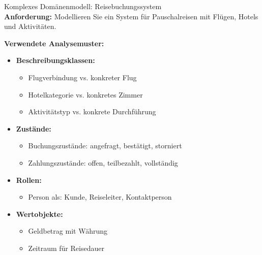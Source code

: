 \begin{example2}{Komplexes Domänenmodell: Reisebuchungssystem}\\
\textbf{Anforderung:} Modellieren Sie ein System für Pauschalreisen mit Flügen, Hotels und Aktivitäten.

\textbf{Verwendete Analysemuster:}
\begin{itemize}
    \item \textbf{Beschreibungsklassen:}
    \begin{itemize}
        \item Flugverbindung vs. konkreter Flug
        \item Hotelkategorie vs. konkretes Zimmer
        \item Aktivitätstyp vs. konkrete Durchführung
    \end{itemize}
    
    \item \textbf{Zustände:}
    \begin{itemize}
        \item Buchungszustände: angefragt, bestätigt, storniert
        \item Zahlungszustände: offen, teilbezahlt, vollständig
    \end{itemize}
    
    \item \textbf{Rollen:}
    \begin{itemize}
        \item Person als: Kunde, Reiseleiter, Kontaktperson
    \end{itemize}
    
    \item \textbf{Wertobjekte:}
    \begin{itemize}
        \item Geldbetrag mit Währung
        \item Zeitraum für Reisedauer
    \end{itemize}
\end{itemize}
\end{example2}

